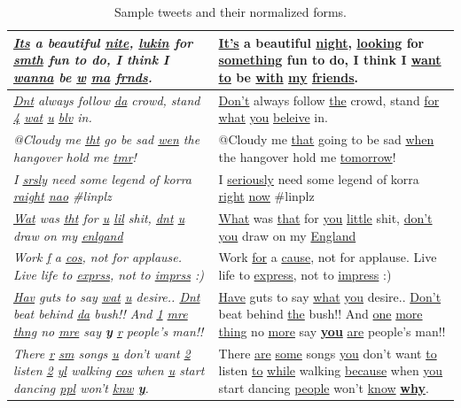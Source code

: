\documentclass[a4paper,onesided,12pt]{report}
\begin{document}
\begin{table}[hbp]
\caption[Sample tweets and their normalized forms.]{Sample tweets and their normalized forms.}
\label{tab:sentences}
\begin{tabular}{|>{\itshape}p{7cm}|p{7cm}|}
\hline
\underline{Its} a beautiful \underline{nite}, \underline{lukin} for \underline{smth} fun to do, I think I \underline{wanna} be \underline{w} \underline{ma} \underline{frnds}. &
\underline{It’s} a beautiful \underline{night}, \underline{looking} for \underline{something} fun to do, I think I \underline{want to} be \underline{with} \underline{my} \underline{friends}. \\
\hline
\underline{Dnt} always follow \underline{da} crowd, stand \underline{4} \underline{wat} \underline{u} \underline{blv} in. &
\underline{Don't} always follow \underline{the} crowd, stand \underline{for} \underline{what} \underline{you} \underline{beleive} in. \\
\hline
@Cloudy me \underline{tht} go be sad \underline{wen} the hangover hold me \underline{tmr}! &

@Cloudy me \underline{that} going to be sad \underline{when} the hangover hold me \underline{tomorrow}! \\
\hline
I \underline{srsly} need some legend of korra \underline{raight} \underline{nao} \#linplz &
I \underline{seriously} need some legend of korra \underline{right} \underline{now} \#linplz \\
\hline
\underline{Wat} was \underline{tht} for \underline{u} \underline{lil} shit, \underline{dnt} \underline{u} draw on my \underline{enlgand} &
\underline{What} was \underline{that} for \underline{you} \underline{little} shit, \underline{don’t} \underline{you} draw on my \underline{England} \\ \hline
Work \underline{f} a \underline{cos}, not for applause. Live life to \underline{exprss}, not to \underline{imprss} :) & Work \underline{for} a \underline{cause}, not for applause. Live life to \underline{express}, not to \underline{impress} :) \\ \hline
\underline{Hav} guts to say \underline{wat} \underline{u} desire.. \underline{Dnt} beat behind \underline{da} bush!! And \underline{1} \underline{mre} \underline{thng} no \underline{mre} say \textbf{\underline{y}} \underline{r} people's man!! &
\underline{Have} guts to say \underline{what} \underline{you} desire.. \underline{Don’t} beat behind \underline{the} bush!! And \underline{one} \underline{more} \underline{thing} no \underline{more} say \textbf{\underline{you}} \underline{are} people's man!! \\
\hline
There \underline{r} \underline{sm} songs \underline{u} don't want \underline{2} listen \underline{2} \underline{yl} walking \underline{cos} when \underline{u} start dancing \underline{ppl} won't \underline{knw} \textbf{\underline{y}}. &
There \underline{are} \underline{some} songs \underline{you} don't want \underline{to} listen \underline{to} \underline{while} walking \underline{because} when \underline{you} start dancing \underline{people} won't \underline{know} \textbf{\underline{why}}. \\
\hline
\end{tabular}
\end{table}
\end{document}
